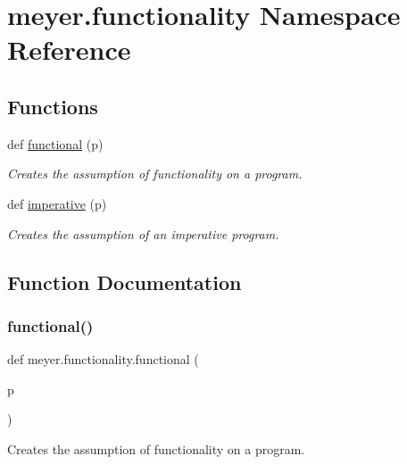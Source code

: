 \hypertarget{namespacemeyer_1_1functionality}{}\section{meyer.\+functionality Namespace Reference}
\label{namespacemeyer_1_1functionality}
\subsection*{Functions}
\begin{DoxyCompactItemize}
\item 
def \hyperlink{namespacemeyer_1_1functionality_abd59b387495be24dc003d05a4c1f8a9e}{functional} (p)
\begin{DoxyCompactList}\small\item\em Creates the assumption of functionality on a program. \end{DoxyCompactList}\item 
def \hyperlink{namespacemeyer_1_1functionality_adfc257b0f6ee273de71eb1e3e7db1f3e}{imperative} (p)
\begin{DoxyCompactList}\small\item\em Creates the assumption of an imperative program. \end{DoxyCompactList}\end{DoxyCompactItemize}


\subsection{Function Documentation}
\mbox{\label{namespacemeyer_1_1functionality_abd59b387495be24dc003d05a4c1f8a9e}} 
\subsubsection{\texorpdfstring{functional()}{functional()}}
{\footnotesize\ttfamily def meyer.\+functionality.\+functional (\begin{DoxyParamCaption}\item[{}]{p }\end{DoxyParamCaption})}



Creates the assumption of functionality on a program. 


